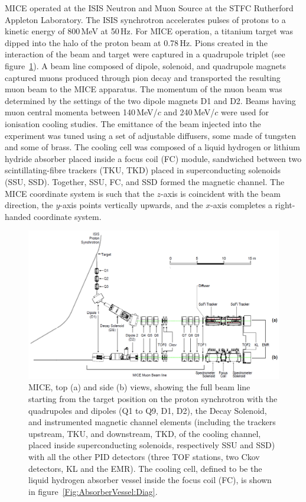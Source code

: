 MICE operated at the ISIS Neutron and Muon Source at the STFC
Rutherford Appleton Laboratory.
The ISIS synchrotron accelerates pulses of protons to a kinetic energy of 800\,MeV at 50\,Hz.
For MICE operation, a titanium target was dipped
into the halo of the proton beam at 0.78\,Hz. 
Pions created in the interaction of the beam and target were captured in a quadrupole triplet
(see figure~\ref{fig:BL}).
A beam line composed of dipole, solenoid, and quadrupole
magnets captured muons produced through pion decay and transported the
resulting muon beam to the MICE apparatus.
The momentum of the muon beam was determined by the settings of the two dipole magnets D1 and D2.
Beams having muon central momenta between 140\,MeV/$c$ and 240\,MeV/$c$ were used for ionisation cooling studies.
The emittance of the beam injected into the experiment was tuned using
a set of adjustable diffusers, some made of tungsten and some of brass.
The cooling cell was composed of a liquid hydrogen or lithium hydride
absorber placed inside a focus coil (FC) module, sandwiched between
two scintillating-fibre trackers (TKU, TKD) placed in superconducting
solenoids (SSU, SSD).
Together, SSU, FC, and SSD formed the magnetic channel.
The MICE coordinate system is such that the $z$-axis is coincident
with the beam direction, the $y$-axis points vertically upwards, and the
$x$-axis completes a right-handed coordinate system.

\begin{figure}[htb!]
  \begin{center}
    \includegraphics[width=1.0\columnwidth]{BL.png}
    \caption{
      MICE, top (a) and side (b) views, showing the full beam line
      starting from the target position on the proton synchrotron with the quadrupoles and dipoles (Q1 to Q9, D1, D2), the
      Decay Solenoid, and instrumented magnetic channel elements
      (including the trackers upstream, TKU, and downstream, TKD, of the cooling
      channel, placed inside superconducting solenoids, respectively SSU and SSD) with all the
      other PID detectors (three TOF stations, two Ckov detectors, KL and
      the EMR).
      The cooling cell, defined to be the liquid hydrogen absorber
      vessel inside the focus coil (FC), is shown in figure~\ref{Fig:AbsorberVessel:Diag}.
    }
    \label{fig:BL}
  \end{center}
\end{figure}

